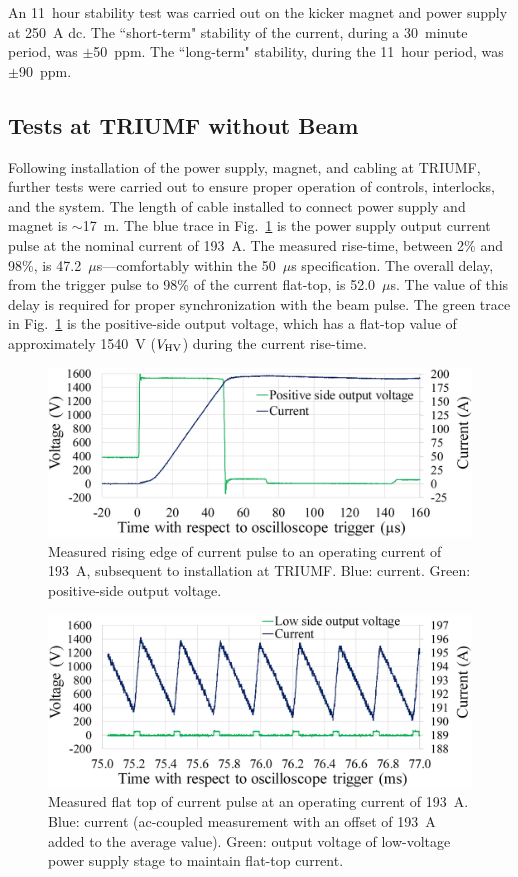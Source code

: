 \documentclass[aps,prab,twocolumn,superscriptaddress]{revtex4-1}
\begin{document}
An 11~hour stability test was carried out on the kicker magnet and power supply at 250~A dc. The ``short-term" stability of the current, during a 30~minute period, was $\pm$50~ppm. The ``long-term" stability, during the 11~hour period, was $\pm$90~ppm. 

\subsection{Tests at TRIUMF without Beam\label{sec:prebeam}}
Following installation of the power supply, magnet, and cabling at TRIUMF, further tests were carried out to ensure proper operation of controls, interlocks, and the system. The length of cable installed to connect power supply and magnet is $\sim$17~m. The blue  trace in Fig.~\ref{fig:risetime} is the power supply output current pulse at the nominal current of 193~A.  The measured rise-time, between 2\% and 98\%, is 47.2~$\mu$s---comfortably within the 50~$\mu$s specification. The overall delay, from the trigger pulse to 98\% of the current flat-top, is 52.0~$\mu$s. The value of this delay is required for proper synchronization with the beam pulse. The green trace in Fig.~\ref{fig:risetime} is the positive-side output voltage, which has a flat-top value of approximately 1540~V (${V_{\rm{HV}}}$) during the current rise-time.
\begin{figure}[h]
\includegraphics[width=\linewidth]{risetime-smaller.png} %
\caption{Measured rising edge of current pulse to an operating current of 193~A, subsequent to installation at TRIUMF. Blue: current. Green: positive-side output voltage.}
\label{fig:risetime}
\end{figure}

\begin{figure}
\includegraphics[width=\linewidth]{flattop-smaller.png} %
\caption{Measured flat top of current pulse at an operating current of 193~A. Blue: current (ac-coupled measurement with an offset of 193~A added to the average value).  Green: output voltage of low-voltage power supply stage to maintain flat-top current. }
\label{fig:flat-top}
\end{figure}
\end{document}
